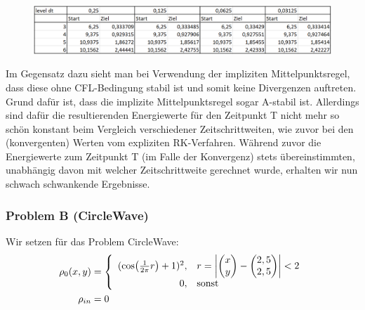 \begin{figure}[H]
	\centering
	\includegraphics[width=\textwidth]{../Aufgabe21/rkorder-2RiemannEnergieTabelle.png}

\end{figure}
Im Gegensatz dazu sieht man bei Verwendung der impliziten Mittelpunktsregel, dass diese ohne CFL-Bedingung stabil ist und somit keine Divergenzen auftreten. Grund dafür ist, dass die implizite Mittelpunktsregel sogar A-stabil ist.
Allerdings sind dafür die resultierenden Energiewerte für den Zeitpunkt T nicht mehr so schön konstant beim Vergleich verschiedener Zeitschrittweiten, wie zuvor bei den (konvergenten) Werten vom expliziten RK-Verfahren.
Während zuvor die Energiewerte zum Zeitpunkt T (im Falle der Konvergenz) stets übereinstimmten, unabhängig davon mit welcher Zeitschrittweite gerechnet wurde, erhalten wir nun schwach schwankende Ergebnisse.



\subsubsection{Problem B (CircleWave)}
Wir setzen für das Problem CircleWave:
\begin{align*}
  \rho_0(x,y) &= 
  \left\{ 
    \begin{array}{r l}
      (\cos(\frac{1}{2 \pi}r)+1)^2,& 
      r = \left| 
      \begin{pmatrix}
        x \\ y \end{pmatrix} 
      - 
      \begin{pmatrix}
        2,5 \\ 2,5 \end{pmatrix} \right| < 2  
      \\
      0 ,& \text{sonst}
    \end{array}      
  \right. 
  \\
  \rho_{in} &= 0
\end{align*}

